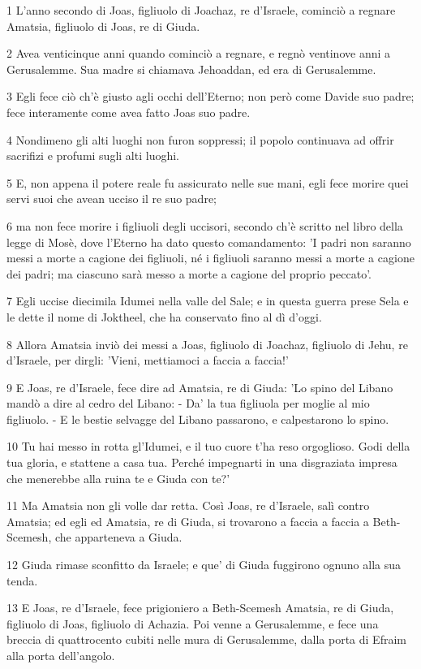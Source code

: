 \par 1 L'anno secondo di Joas, figliuolo di Joachaz, re d'Israele, cominciò a regnare Amatsia, figliuolo di Joas, re di Giuda.
\par 2 Avea venticinque anni quando cominciò a regnare, e regnò ventinove anni a Gerusalemme. Sua madre si chiamava Jehoaddan, ed era di Gerusalemme.
\par 3 Egli fece ciò ch'è giusto agli occhi dell'Eterno; non però come Davide suo padre; fece interamente come avea fatto Joas suo padre.
\par 4 Nondimeno gli alti luoghi non furon soppressi; il popolo continuava ad offrir sacrifizi e profumi sugli alti luoghi.
\par 5 E, non appena il potere reale fu assicurato nelle sue mani, egli fece morire quei servi suoi che avean ucciso il re suo padre;
\par 6 ma non fece morire i figliuoli degli uccisori, secondo ch'è scritto nel libro della legge di Mosè, dove l'Eterno ha dato questo comandamento: 'I padri non saranno messi a morte a cagione dei figliuoli, né i figliuoli saranno messi a morte a cagione dei padri; ma ciascuno sarà messo a morte a cagione del proprio peccato'.
\par 7 Egli uccise diecimila Idumei nella valle del Sale; e in questa guerra prese Sela e le dette il nome di Joktheel, che ha conservato fino al dì d'oggi.
\par 8 Allora Amatsia inviò dei messi a Joas, figliuolo di Joachaz, figliuolo di Jehu, re d'Israele, per dirgli: 'Vieni, mettiamoci a faccia a faccia!'
\par 9 E Joas, re d'Israele, fece dire ad Amatsia, re di Giuda: 'Lo spino del Libano mandò a dire al cedro del Libano: - Da' la tua figliuola per moglie al mio figliuolo. - E le bestie selvagge del Libano passarono, e calpestarono lo spino.
\par 10 Tu hai messo in rotta gl'Idumei, e il tuo cuore t'ha reso orgoglioso. Godi della tua gloria, e stattene a casa tua. Perché impegnarti in una disgraziata impresa che menerebbe alla ruina te e Giuda con te?'
\par 11 Ma Amatsia non gli volle dar retta. Così Joas, re d'Israele, salì contro Amatsia; ed egli ed Amatsia, re di Giuda, si trovarono a faccia a faccia a Beth-Scemesh, che apparteneva a Giuda.
\par 12 Giuda rimase sconfitto da Israele; e que' di Giuda fuggirono ognuno alla sua tenda.
\par 13 E Joas, re d'Israele, fece prigioniero a Beth-Scemesh Amatsia, re di Giuda, figliuolo di Joas, figliuolo di Achazia. Poi venne a Gerusalemme, e fece una breccia di quattrocento cubiti nelle mura di Gerusalemme, dalla porta di Efraim alla porta dell'angolo.

